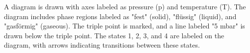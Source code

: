 A diagram is drawn with axes labeled as pressure (p) and temperature (T). The diagram includes phase regions labeled as "fest" (solid), "flüssig" (liquid), and "gasförmig" (gaseous). The triple point is marked, and a line labeled "5 mbar" is drawn below the triple point. The states 1, 2, 3, and 4 are labeled on the diagram, with arrows indicating transitions between these states.